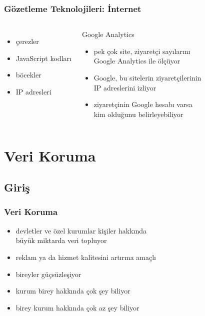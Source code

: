 \documentclass[dvipsnames]{beamer}
\theoremstyle{plain}
\begin{document}
\begin{frame}
  \frametitle{Gözetleme Teknolojileri: İnternet}

  \begin{columns}[t]
    \begin{itemize}
      \item çerezler
      \item JavaScript kodları
      \item böcekler
      \item IP adresleri
    \end{itemize}

    \pause
    \begin{exampleblock}{Google Analytics}
      \begin{itemize}
        \item pek çok site, ziyaretçi sayılarını\\
          Google Analytics ile ölçüyor
        \item Google, bu sitelerin ziyaretçilerinin\\
          IP adreslerini izliyor
        \item ziyaretçinin Google hesabı varsa\\
          kim olduğunu belirleyebiliyor
      \end{itemize}
    \end{exampleblock}
  \end{columns}
\end{frame}

\section{Veri Koruma}

\subsection{Giriş}

\begin{frame}
  \frametitle{Veri Koruma}

  \begin{itemize}
    \item devletler ve özel kurumlar kişiler hakkında\\
      büyük miktarda veri topluyor
    \item reklam ya da hizmet kalitesini artırma amaçlı

    \bigskip
    \item bireyler güçsüzleşiyor
    \item kurum birey hakkında çok şey biliyor
    \item birey kurum hakkında çok az şey biliyor
  \end{itemize}
\end{frame}
\end{document}
